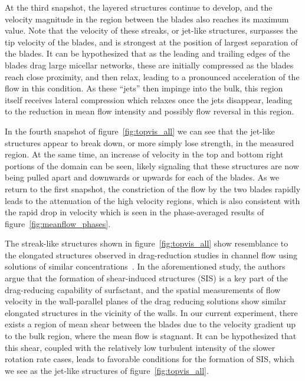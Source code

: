 \documentclass[aps,prfluids,groupedaddress,showkeys,11pt,tightenlines]{revtex4-2}
\begin{document}
At the third snapshot, the layered structures continue to develop, and the velocity magnitude in the region between the blades also reaches its maximum value. Note that the velocity of these streaks, or jet-like structures, surpasses the tip velocity of the blades, and is strongest at the position of largest separation of the blades. It can be hypothesized that as the leading and trailing edges of the blades drag large micellar networks, these are initially compressed as the blades reach close proximity, and then relax, leading to a pronounced acceleration of the flow in this condition. As these ``jets'' then impinge into the bulk, this region itself receives lateral compression which relaxes once the jets disappear, leading to the reduction in mean flow intensity and possibly flow reversal in this region.

In the fourth snapshot of figure~\ref{fig:topvis_all} we can see that the jet-like structures appear to break down, or more simply lose strength, in the measured region. At the same time, an increase of velocity in the top and bottom right portions of the domain can be seen, likely signaling that these structures are now being pulled apart and downwards or upwards for each of the blades. As we return to the first snapshot, the constriction of the flow by the two blades rapidly leads to the attenuation of the high velocity regions, which is also consistent with the rapid drop in velocity which is seen in the phase-averaged results of figure~\ref{fig:meanflow_phases}.

The streak-like structures shown in figure~\ref{fig:topvis_all} show resemblance to the elongated structures observed in drag-reduction studies in channel flow using solutions of similar concentrations~\cite{motozawa_experimental_2011}. In the aforementioned study, the authors argue that the formation of shear-induced structures (SIS) is a key part of the drag-reducing capability of surfactant, and the spatial measurements of flow velocity in the wall-parallel planes of the drag reducing solutions show similar elongated structures in the vicinity of the walls. In our current experiment, there exists a region of mean shear between the blades due to the velocity gradient up to the bulk region, where the mean flow is stagnant. It can be hypothesized that this shear, coupled with the relatively low turbulent intensity of the slower rotation rate cases, leads to favorable conditions for the formation of SIS, which we see as the jet-like structures of figure~\ref{fig:topvis_all}. 
\end{document}
